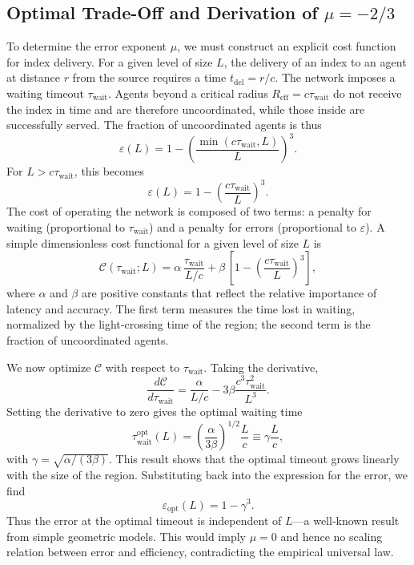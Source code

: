 \documentclass[12pt,a4paper]{article}
\begin{document}
	\subsection{Optimal Trade-Off and Derivation of \(\mu = -2/3\)}
	To determine the error exponent \(\mu\), we must construct an explicit cost function for index delivery. For a given level of size \(L\), the delivery of an index to an agent at distance \(r\) from the source requires a time \(t_{\mathrm{del}} = r/c\). The network imposes a waiting timeout \(\tau_{\mathrm{wait}}\). Agents beyond a critical radius \(R_{\mathrm{eff}} = c\tau_{\mathrm{wait}}\) do not receive the index in time and are therefore uncoordinated, while those inside are successfully served. The fraction of uncoordinated agents is thus
	\[
	\varepsilon(L) = 1 - \left(\frac{\min(c\tau_{\mathrm{wait}},L)}{L}\right)^3.
	\]
	For \(L > c\tau_{\mathrm{wait}}\), this becomes
	\[
	\varepsilon(L) = 1 - \left(\frac{c\tau_{\mathrm{wait}}}{L}\right)^3.
	\]
	The cost of operating the network is composed of two terms: a penalty for waiting (proportional to \(\tau_{\mathrm{wait}}\)) and a penalty for errors (proportional to \(\varepsilon\)). A simple dimensionless cost functional for a given level of size \(L\) is
	\begin{equation}
		\mathcal{C}(\tau_{\mathrm{wait}}; L) = \alpha\, \frac{\tau_{\mathrm{wait}}}{L/c} + \beta\,\left[1 - \left(\frac{c\tau_{\mathrm{wait}}}{L}\right)^3\right],
		\label{eq:cost}
	\end{equation}
	where \(\alpha\) and \(\beta\) are positive constants that reflect the relative importance of latency and accuracy. The first term measures the time lost in waiting, normalized by the light‑crossing time of the region; the second term is the fraction of uncoordinated agents.
	
	We now optimize \(\mathcal{C}\) with respect to \(\tau_{\mathrm{wait}}\). Taking the derivative,
	\[
	\frac{d\mathcal{C}}{d\tau_{\mathrm{wait}}} = \frac{\alpha}{L/c} - 3\beta \frac{c^3\tau_{\mathrm{wait}}^2}{L^3}.
	\]
	Setting the derivative to zero gives the optimal waiting time
	\[
	\tau_{\mathrm{wait}}^{\mathrm{opt}}(L) = \left(\frac{\alpha}{3\beta}\right)^{1/2} \frac{L}{c} \equiv \gamma \frac{L}{c},
	\]
	with \(\gamma = \sqrt{\alpha/(3\beta)}\). This result shows that the optimal timeout grows linearly with the size of the region. Substituting back into the expression for the error, we find
	\[
	\varepsilon_{\mathrm{opt}}(L) = 1 - \gamma^3.
	\]
	Thus the error at the optimal timeout is independent of \(L\)—a well‑known result from simple geometric models. This would imply \(\mu = 0\) and hence no scaling relation between error and efficiency, contradicting the empirical universal law.
	
\end{document}
